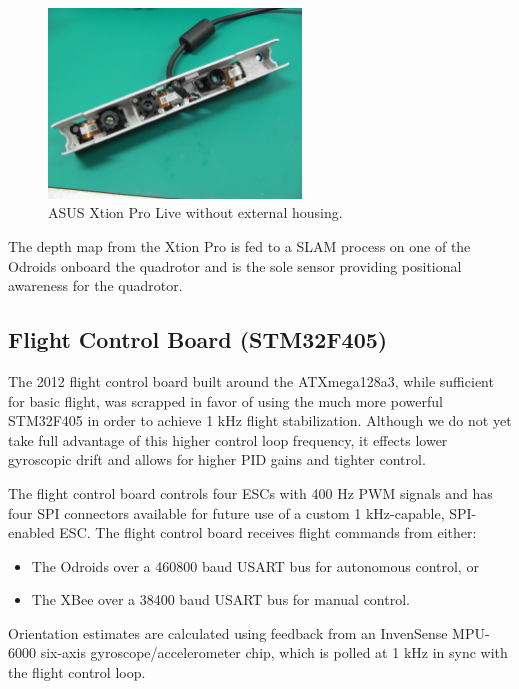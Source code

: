 \documentclass[12pt,letterpaper]{article} \usepackage[margin=1in]{geometry}
\begin{document}
\begin{figure}[!h]
	\centering
	\includegraphics[width=0.6\textwidth]{img/xtion.jpg}
	\caption{ASUS Xtion Pro Live without external housing.}
	\label{fig:xtion}
\end{figure}

The depth map from the Xtion Pro is fed to a SLAM process on one of the Odroids
onboard the quadrotor and is the sole sensor providing positional awareness for
the quadrotor.


\subsection*{Flight Control Board (STM32F405)}

The 2012 flight control board built around the ATXmega128a3, while sufficient
for basic flight, was scrapped in favor of using the much more powerful
STM32F405 in order to achieve 1 kHz flight stabilization. Although we do not
yet take full advantage of this higher control loop frequency, it effects lower
gyroscopic drift and allows for higher PID gains and tighter control.

The flight control board controls four ESCs with 400 Hz PWM signals and has
four SPI connectors available for future use of a custom 1 kHz-capable,
SPI-enabled ESC. The flight control board receives flight commands from either:

\begin{itemize}
	\item The Odroids over a 460800 baud USART bus for autonomous control, or
	\item The XBee over a 38400 baud USART bus for manual control.
\end{itemize}

Orientation estimates are calculated using feedback from an InvenSense MPU-6000
six-axis gyroscope/accelerometer chip, which is polled at 1 kHz in sync with
the flight control loop.
\end{document}
